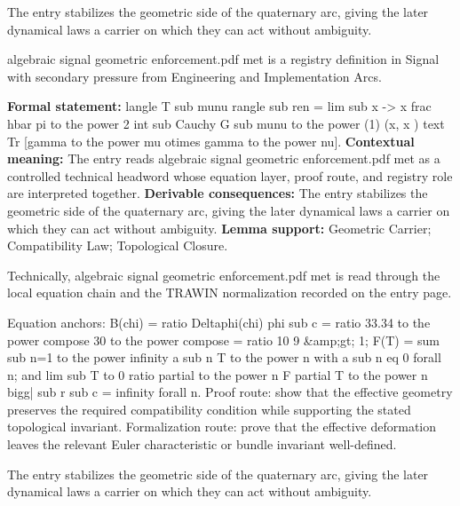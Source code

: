 The entry stabilizes the geometric side of the quaternary arc, giving the later dynamical laws a carrier on which they can act without ambiguity.
\clearpage


\begingroup\small
{}
algebraic signal geometric enforcement.pdf met is a registry definition in Signal with secondary pressure from Engineering and Implementation Arcs.

\begingroup\footnotesize\setlength{\emergencystretch}{3em}\sloppy
\textbf{Formal statement:} langle T sub munu rangle sub ren = lim sub x -> x frac hbar pi to the power 2 int sub Cauchy G sub munu to the power (1) (x, x ) text Tr [gamma to the power mu otimes gamma to the power nu]. \textbf{Contextual meaning:} The entry reads algebraic signal geometric enforcement.pdf met as a controlled technical headword whose equation layer, proof route, and registry role are interpreted together. \textbf{Derivable consequences:} The entry stabilizes the geometric side of the quaternary arc, giving the later dynamical laws a carrier on which they can act without ambiguity. \textbf{Lemma support:} Geometric Carrier; Compatibility Law; Topological Closure.\par
\endgroup

Technically, algebraic signal geometric enforcement.pdf met is read through the local equation chain and the TRAWIN normalization recorded on the entry page.

Equation anchors: B(chi) = ratio Deltaphi(chi) phi sub c = ratio 33.34 to the power compose 30 to the power compose = ratio 10 9 \&amp;gt; 1; F(T) = sum sub n=1 to the power infinity a sub n T to the power n with a sub n eq 0 forall n; and lim sub T to 0 ratio partial to the power n F partial T to the power n bigg| sub r sub c = infinity forall n. Proof route: show that the effective geometry preserves the required compatibility condition while supporting the stated topological invariant. Formalization route: prove that the effective deformation leaves the relevant Euler characteristic or bundle invariant well-defined.

The entry stabilizes the geometric side of the quaternary arc, giving the later dynamical laws a carrier on which they can act without ambiguity.
\endgroup


